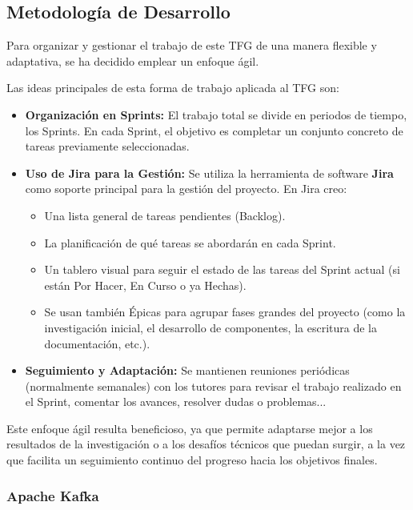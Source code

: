 
\subsection{Metodología de Desarrollo}

Para organizar y gestionar el trabajo de este TFG de una manera flexible y adaptativa, se ha decidido emplear un enfoque ágil.

Las ideas principales de esta forma de trabajo aplicada al TFG son:

\begin{itemize}
    \item \textbf{Organización en Sprints:} El trabajo total se divide en periodos de tiempo, los Sprints. En cada Sprint, el objetivo es completar un conjunto concreto de tareas previamente seleccionadas.
    
    \item \textbf{Uso de Jira para la Gestión:} Se utiliza la herramienta de software \textbf{Jira} como soporte principal para la gestión del proyecto. En Jira creo:
        \begin{itemize}
            \item Una lista general de tareas pendientes (Backlog).
            \item La planificación de qué tareas se abordarán en cada Sprint.
            \item Un tablero visual para seguir el estado de las tareas del Sprint actual (si están Por Hacer, En Curso o ya Hechas).
            \item Se usan también Épicas para agrupar fases grandes del proyecto (como la investigación inicial, el desarrollo de componentes, la escritura de la documentación, etc.).
        \end{itemize}
    
    \item \textbf{Seguimiento y Adaptación:} Se mantienen reuniones periódicas (normalmente semanales) con los tutores para revisar el trabajo realizado en el Sprint, comentar los avances, resolver dudas o problemas...
\end{itemize}

Este enfoque ágil resulta beneficioso, ya que permite adaptarse mejor a los resultados de la investigación o a los desafíos técnicos que puedan surgir, a la vez que facilita un seguimiento continuo del progreso hacia los objetivos finales.

\subsubsection{Apache Kafka}

